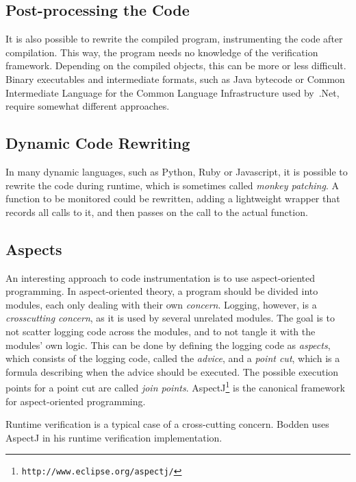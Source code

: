 \documentclass[a4paper,11pt]{kth-mag}
\begin{document}
\subsection{Post-processing the Code}

It is also possible to rewrite the compiled program, instrumenting the code
after compilation. This way, the program needs no knowledge of the verification
framework. Depending on the compiled objects, this can be more or less
difficult. Binary executables and intermediate formats, such as Java bytecode
or Common Intermediate Language for the Common Language Infrastructure used
by~.Net, require somewhat different approaches.


\subsection{Dynamic Code Rewriting}

In many dynamic languages, such as Python, Ruby or Javascript, it is possible
to rewrite the code during runtime, which is sometimes called \textit{monkey
patching}. A function to be monitored could be rewritten, adding a lightweight
wrapper that records all calls to it, and then passes on the call to the actual
function.


\subsection{Aspects} \label{section-aspects}

An interesting approach to code instrumentation is to use aspect-oriented
programming. In aspect-oriented theory, a program should be divided into
modules, each only dealing with their own \textit{concern}. Logging, however,
is a \textit{crosscutting concern}, as it is used by several unrelated modules.
The goal is to not scatter logging code across the modules, and to not tangle
it with the modules' own logic. This can be done by defining the logging code
as \textit{aspects}, which consists of the logging code, called the
\textit{advice}, and a \textit{point cut}, which is a formula describing when
the advice should be executed. The possible execution points for a point cut
are called \textit{join points}.
AspectJ\footnote{\texttt{http://www.eclipse.org/aspectj/}} is the canonical
framework for aspect-oriented programming.

Runtime verification is a typical case of a cross-cutting concern. Bodden
\cite{bodden05efficientrv} uses AspectJ in his runtime verification
implementation.
\end{document}
